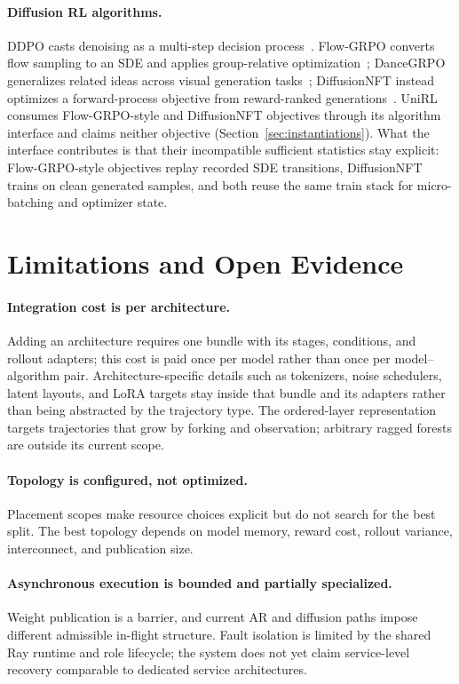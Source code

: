 \documentclass[10pt]{article}
\begin{document}
\paragraph{Diffusion RL algorithms.}
DDPO casts denoising as a multi-step decision process~\citep{black2023ddpo}.
Flow-GRPO converts flow sampling to an SDE and applies group-relative optimization~\citep{liu2025flowgrpo}; DanceGRPO generalizes related ideas across visual generation tasks~\citep{xue2025dancegrpo}; DiffusionNFT instead optimizes a forward-process objective from reward-ranked generations~\citep{zheng2025diffusionnft}.
UniRL consumes Flow-GRPO-style and DiffusionNFT objectives through its algorithm interface and claims neither objective (Section~\ref{sec:instantiations}).
What the interface contributes is that their incompatible sufficient statistics stay explicit: Flow-GRPO-style objectives replay recorded SDE transitions, DiffusionNFT trains on clean generated samples, and both reuse the same train stack for micro-batching and optimizer state.

\section{Limitations and Open Evidence}
\label{sec:limitations}

\paragraph{Integration cost is per architecture.}
Adding an architecture requires one bundle with its stages, conditions, and rollout adapters; this cost is paid once per model rather than once per model--algorithm pair.
Architecture-specific details such as tokenizers, noise schedulers, latent layouts, and LoRA targets stay inside that bundle and its adapters rather than being abstracted by the trajectory type.
The ordered-layer representation targets trajectories that grow by forking and observation; arbitrary ragged forests are outside its current scope.

\paragraph{Topology is configured, not optimized.}
Placement scopes make resource choices explicit but do not search for the best split.
The best topology depends on model memory, reward cost, rollout variance, interconnect, and publication size.

\paragraph{Asynchronous execution is bounded and partially specialized.}
Weight publication is a barrier, and current AR and diffusion paths impose different admissible in-flight structure.
Fault isolation is limited by the shared Ray runtime and role lifecycle; the system does not yet claim service-level recovery comparable to dedicated service architectures.
\end{document}
